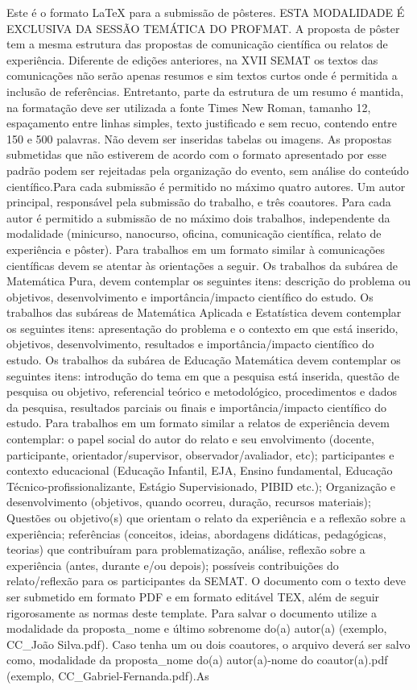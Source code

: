 \documentclass{semat}
\begin{document}
\noindent Este é o formato \LaTeX{} para a submissão de pôsteres. ESTA MODALIDADE É EXCLUSIVA DA SESSÃO TEMÁTICA DO PROFMAT. A proposta de pôster tem a mesma estrutura das propostas de comunicação científica ou relatos de experiência. Diferente de edições anteriores, na XVII SEMAT os textos das comunicações não serão apenas resumos e sim textos curtos onde é permitida a inclusão de referências. Entretanto, parte da estrutura de um resumo é mantida,  na formatação deve ser utilizada a fonte Times New Roman, tamanho 12, espaçamento entre linhas simples, texto justificado e sem recuo, contendo entre 150 e 500 palavras. Não devem ser inseridas tabelas ou imagens. As propostas submetidas que não estiverem de acordo com o formato apresentado por esse padrão podem ser rejeitadas pela organização do evento, sem análise do conteúdo científico.Para cada submissão é permitido no máximo quatro autores. Um autor principal, responsável pela submissão do trabalho, e três coautores. Para cada autor é permitido a submissão de no máximo dois trabalhos, independente da modalidade (minicurso, nanocurso, oficina, comunicação científica, relato de experiência e pôster). Para trabalhos em um formato similar à comunicações científicas devem se atentar às orientações a seguir.  Os trabalhos da subárea de Matemática Pura, devem contemplar os seguintes itens: descrição do problema ou objetivos, desenvolvimento e importância/impacto científico do estudo. Os trabalhos das subáreas de Matemática Aplicada e Estatística devem contemplar os seguintes itens: apresentação do problema e o contexto em que está inserido, objetivos, desenvolvimento, resultados e importância/impacto científico do estudo. Os trabalhos da subárea de Educação Matemática devem contemplar os seguintes itens: introdução do tema em que a pesquisa está inserida, questão de pesquisa ou objetivo, referencial teórico e metodológico, procedimentos e dados da pesquisa, resultados parciais ou finais e importância/impacto científico do estudo. Para trabalhos em um formato similar a relatos de experiência devem contemplar: o papel social do autor do relato e seu envolvimento (docente, participante, orientador/supervisor, observador/avaliador, etc); participantes e contexto educacional (Educação Infantil, EJA, Ensino fundamental, Educação Técnico-profissionalizante, Estágio Supervisionado, PIBID etc.); Organização e desenvolvimento (objetivos, quando ocorreu, duração, recursos materiais); Questões ou objetivo(s) que orientam o relato da experiência e a reflexão sobre a experiência; referências (conceitos, ideias, abordagens didáticas, pedagógicas, teorias) que contribuíram para problematização, análise, reflexão sobre a experiência (antes, durante e/ou depois); possíveis contribuições do relato/reflexão para os participantes da SEMAT. O documento com o texto deve ser submetido em formato PDF e em formato editável TEX, além de seguir rigorosamente as normas deste template. Para salvar o documento utilize a modalidade da proposta\_nome e último sobrenome do(a) autor(a) (exemplo, CC\_João Silva.pdf). Caso tenha um ou dois coautores, o arquivo deverá ser salvo como, modalidade da proposta\_nome do(a) autor(a)-nome do coautor(a).pdf (exemplo, CC\_Gabriel-Fernanda.pdf).As 
\end{document}
